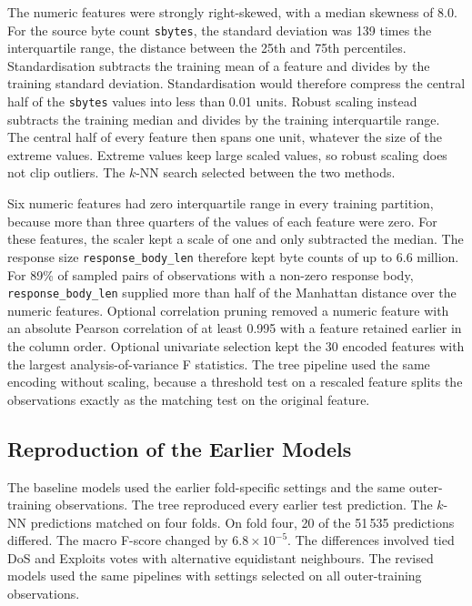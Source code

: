 \documentclass[conference]{IEEEtran}
\newcommand{\knn}{\mbox{$k$-NN}}
\begin{document}
The numeric features were strongly right-skewed, with a median skewness of 8.0. For the source byte count \texttt{sbytes}, the standard deviation was 139 times the interquartile range, the distance between the 25th and 75th percentiles. Standardisation subtracts the training mean of a feature and divides by the training standard deviation. Standardisation would therefore compress the central half of the \texttt{sbytes} values into less than 0.01 units. Robust scaling instead subtracts the training median and divides by the training interquartile range. The central half of every feature then spans one unit, whatever the size of the extreme values. Extreme values keep large scaled values, so robust scaling does not clip outliers. The \knn{} search selected between the two methods.

Six numeric features had zero interquartile range in every training partition, because more than three quarters of the values of each feature were zero. For these features, the scaler kept a scale of one and only subtracted the median. The response size \texttt{response\_body\_len} therefore kept byte counts of up to 6.6 million. For 89\% of sampled pairs of observations with a non-zero response body, \texttt{response\_body\_len} supplied more than half of the Manhattan distance over the numeric features. Optional correlation pruning removed a numeric feature with an absolute Pearson correlation of at least 0.995 with a feature retained earlier in the column order. Optional univariate selection kept the 30 encoded features with the largest analysis-of-variance F statistics. The tree pipeline used the same encoding without scaling, because a threshold test on a rescaled feature splits the observations exactly as the matching test on the original feature.

\subsection{Reproduction of the Earlier Models}
The baseline models used the earlier fold-specific settings and the same outer-training observations. The tree reproduced every earlier test prediction. The \knn{} predictions matched on four folds. On fold four, 20 of the 51\,535 predictions differed. The macro F-score changed by $6.8\times10^{-5}$. The differences involved tied DoS and Exploits votes with alternative equidistant neighbours. The revised models used the same pipelines with settings selected on all outer-training observations.
\end{document}
